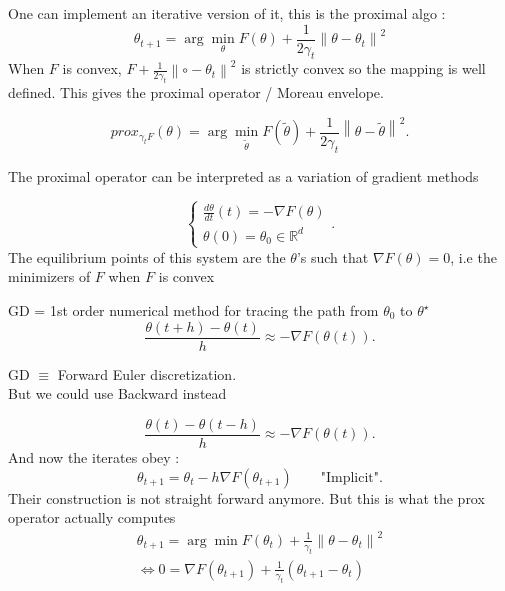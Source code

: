 \begin{note}
    One can implement an iterative version of it, this is the proximal algo : 
    \[ 
        \theta _{t+1} = \arg \min_{\theta} F(\theta) + \frac{1}{2 \gamma _t} \left\| \theta - \theta_t  \right\|^2 
    \]
    When $ F $ is convex, $ F + \frac{1}{2 \gamma _t} \left\| \circ  - \theta _t \right\| ^2 $ is strictly convex so the mapping is well defined. This gives the proximal operator / Moreau envelope. 
    
    \[
        prox _{\gamma _t F} (\theta ) = \arg \min_{\tilde{\theta}} F(\tilde{\theta }) + \frac{1}{2 \gamma _t} \left\| \theta - \tilde{\theta}  \right\|^2 
    .\]

    The proximal operator can be interpreted as a variation of gradient methods 
    
    \[
        \begin{cases}
            \frac{d \theta }{dt}(t) = - \nabla F(\theta ) \\
            \theta (0) = \theta _0 \in \mathbb{R}^d
        \end{cases}
    .\]
    The equilibrium points of this system are the $\theta $'s such that $\nabla F(\theta )= 0$, i.e the minimizers of $ F $  when $ F $  is convex
    
    GD = 1st order numerical method for tracing the path from $ \theta _0 $ to $ \theta ^\star  $ 
    \[
        \frac{\theta (t + h) - \theta (t)}{h} \approx - \nabla F(\theta (t))
    .\]
    
    GD $\equiv$ Forward Euler discretization. \\
    But we could use Backward instead 
        
    \[
        \frac{\theta (t) - \theta (t -h)}{h} \approx - \nabla F(\theta (t))
    .\]
    And now the iterates obey :
    \[
        \theta_{t+1} = \theta _t - h \nabla F(\theta_{t+1}) \qquad \text{"Implicit"}
    .\]
    Their construction is not straight forward anymore. But this is what the prox operator actually computes 
    \begin{align*}
        \theta _{t+1} = \arg \min F(\theta _t) + \frac{1}{\gamma _t } \left\| \theta -\theta _t \right\| ^2 \\
        \Leftrightarrow 0 = \nabla F(\theta _{t + 1}) + \frac{1 }{\gamma _t} (\theta _{t+1} - \theta _t)
    \end{align*}
\end{note}


